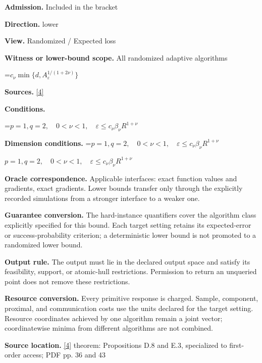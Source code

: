 \documentclass[10pt,a4paper]{article}
\newcommand{\AtlasMath}[1]{\par\begingroup\centering\setbox0=\hbox{$\displaystyle #1$}\ifdim\wd0>1.4\linewidth\typeout{ATLAS WIDE FORMULA: \the\wd0}\fi\ifdim\wd0>\linewidth\resizebox{\linewidth}{!}{\box0}\else\box0\fi\par\endgroup}
\newcommand{\AtlasInlineMath}[1]{\begingroup\setbox0=\hbox{$#1$}\ifdim\wd0>.4\linewidth\endgroup\AtlasMath{#1}\else\endgroup$#1$\fi}
\begin{document}
\textbf{Admission.} Included in the bracket



\textbf{Direction.} lower



\textbf{View.} Randomized / Expected loss



\textbf{Witness or lower-bound scope.} All randomized adaptive algorithms



\AtlasMath{c_\nu\min\{d,A_\varepsilon^{1/(1+2\nu)}\}}


\textbf{Sources.} \href{https://arxiv.org/pdf/2609.32910}{[4]}



\textbf{Conditions.}
\AtlasMath{p=1,q=2,\quad0<\nu<1,\quad\varepsilon\le c_\nu\beta_\nu R^{1+\nu}}




\textbf{Dimension conditions.} \AtlasInlineMath{p=1,q=2,\quad0<\nu<1,\quad\varepsilon\le c_\nu\beta_\nu R^{1+\nu}}



\textbf{Oracle correspondence.} Applicable interfaces: exact function values and gradients, exact gradients. Lower bounds transfer only through the explicitly recorded simulations from a stronger interface to a weaker one.



\textbf{Guarantee conversion.} The hard-instance quantifiers cover the algorithm class explicitly specified for this bound. Each target setting retains its expected-error or success-probability criterion; a deterministic lower bound is not promoted to a randomized lower bound.



\textbf{Output rule.} The output must lie in the declared output space and satisfy its feasibility, support, or atomic-hull restrictions. Permission to return an unqueried point does not remove these restrictions.



\textbf{Resource conversion.} Every primitive response is charged. Sample, component, proximal, and communication costs use the units declared for the target setting. Resource coordinates achieved by one algorithm remain a joint vector; coordinatewise minima from different algorithms are not combined.



\textbf{Source location.} \href{https://arxiv.org/pdf/2609.32910}{[4]} theorem: Propositions D.8 and E.3, specialized to first-order access; PDF pp. 36 and 43
\end{document}

